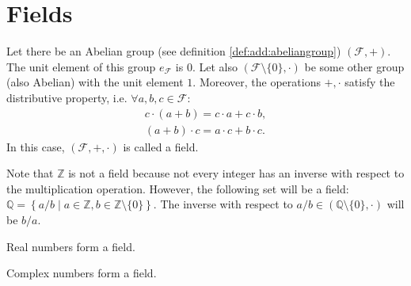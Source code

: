 \section{Fields}
\begin{definition}
  Let there be an Abelian group (see definition
  \ref{def:add:abeliangroup}) 
  $(\mathcal{F}, +)$. The unit element of this group $e_\mathcal{F}$ is
  $0$. Let also $(\mathcal{F} \setminus \{0\}, \cdot)$ be some
  other group (also Abelian) with the unit element $1$. Moreover, the operations
  $+,\cdot$ satisfy the distributive property, i.e. $\forall
  a,b,c \in \mathcal{F}$:
  \begin{eqnarray}
  c \cdot \left(a + b\right) = c \cdot a + c \cdot b,
  \nonumber \\
  \left(a + b\right) \cdot c = a \cdot c + b \cdot c.
  \nonumber
  \end{eqnarray}
  In this case, $(\mathcal{F}, +, \cdot)$ is called a field.
  \label{def:field}
\end{definition}

\begin{example}
  Note that $\mathbb{Z}$ is not a field because not every
  integer has an inverse with respect to the multiplication operation.
  However, the following set will be a field: $\mathbb{Q} =
  \left\{a/b \mid a \in \mathbb{Z}, b \in
  \mathbb{Z}\setminus\{0\}\right\}$. The inverse with respect to
  $a/b \in \left(\mathbb{Q}\setminus\{0\}, \cdot\right)$ will be $b/a$.
  \label{ex:field_q}
\end{example}

\begin{example}
  Real numbers form a field.
  \label{ex:field_r}
\end{example}

\begin{example}
  Complex numbers form a field.
  \label{ex:field_c}
\end{example}